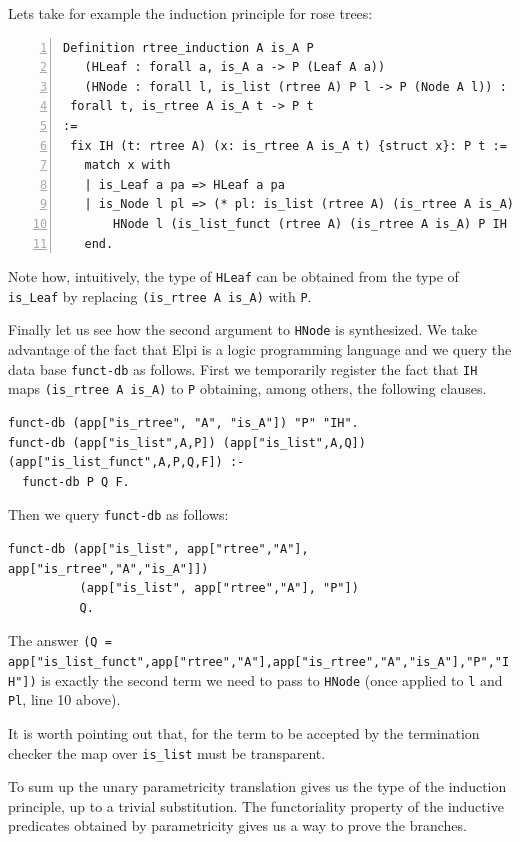 \documentclass[a4paper,UKenglish,cleveref, autoref]{lipics-v2019}
\begin{document}
Lets take for example the induction principle for rose trees:
\begin{lstlisting}[numbers=left]
Definition rtree_induction A is_A P  
   (HLeaf : forall a, is_A a -> P (Leaf A a))
   (HNode : forall l, is_list (rtree A) P l -> P (Node A l)) :
 forall t, is_rtree A is_A t -> P t
:=
 fix IH (t: rtree A) (x: is_rtree A is_A t) {struct x}: P t :=
   match x with
   | is_Leaf a pa => HLeaf a pa
   | is_Node l pl => (* pl: is_list (rtree A) (is_rtree A is_A) l *)
       HNode l (is_list_funct (rtree A) (is_rtree A is_A) P IH l pl)
   end.
\end{lstlisting}

Note how, intuitively, the type of \lstinline+HLeaf+ can be obtained from the
type of \lstinline+is_Leaf+ by replacing \lstinline+(is_rtree A is_A)+
with \lstinline+P+.

Finally let us see  how the second argument to \lstinline+HNode+ is
synthesized.  We take advantage of the fact that Elpi is a logic
programming language and we query the data base \lstinline+funct-db+
as follows. First we temporarily register 
the fact that \lstinline+IH+ maps
\lstinline+(is_rtree A is_A)+ to \lstinline+P+ obtaining, among others,
the following clauses.
\begin{lstlisting}[]
funct-db (app["is_rtree", "A", "is_A"]) "P" "IH".
funct-db (app["is_list",A,P]) (app["is_list",A,Q]) (app["is_list_funct",A,P,Q,F]) :-
  funct-db P Q F.
\end{lstlisting}

Then we query \lstinline+funct-db+ as follows:
\begin{lstlisting}[]
funct-db (app["is_list", app["rtree","A"], app["is_rtree","A","is_A"]])
          (app["is_list", app["rtree","A"], "P"])
          Q.
\end{lstlisting}

\noindent
The answer \lstinline+(Q = app["is_list_funct",app["rtree","A"],app["is_rtree","A","is_A"],"P","IH"])+
is exactly the second term we need to pass to \lstinline+HNode+
(once applied to \lstinline+l+ and \lstinline+Pl+, line 10 above).

It is worth pointing out that, for the term to be accepted
by the termination checker the map over \lstinline+is_list+
must be transparent.

To sum up the unary parametricity translation gives us the type
of the induction principle, up to a trivial substitution.
The functoriality property of the inductive predicates obtained by
parametricity gives us a way to prove the branches.
\end{document}
